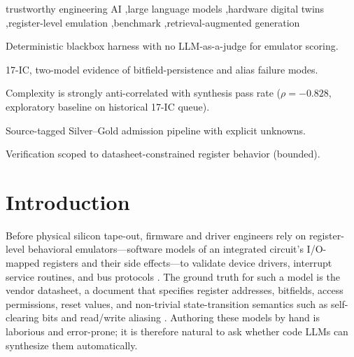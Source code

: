 \documentclass[preprint,review]{elsarticle}
\theoremstyle{definition}
\begin{document}
\begin{abstract}
\textbf{Conclusion.} The evidence indicates that bitfield persistence and address
aliasing constitute persistent, cross-model failure modes for code LLMs. We argue that
source constraints, explicit unknowns, conditional execution, and independent acceptance
jointly form an auditable agentic loop, and outline the verification and experiment
design required before submission.
\end{abstract}

\begin{keyword}
trustworthy engineering AI \sep large language models \sep hardware digital twins
\sep register-level emulation \sep benchmark \sep retrieval-augmented generation
\end{keyword}

\begin{highlights}
\item Deterministic blackbox harness with no LLM-as-a-judge for emulator scoring.
\item 17-IC, two-model evidence of bitfield-persistence and alias failure modes.
\item Complexity is strongly anti-correlated with synthesis pass rate ($\rho=-0.828$, exploratory baseline on historical 17-IC queue).
\item Source-tagged Silver--Gold admission pipeline with explicit unknowns.
\item Verification scoped to datasheet-constrained register behavior (bounded).
\end{highlights}

\maketitle

\section{Introduction}
\label{sec:intro}

Before physical silicon tape-out, firmware and driver engineers rely on register-level
behavioral emulators---software models of an integrated circuit's I/O-mapped registers
and their side effects---to validate device drivers, interrupt service routines, and
bus protocols \cite{bellard2005qemu,ghenassia2005transaction}. The ground truth for such
a model is the vendor datasheet, a document that specifies register addresses, bitfields,
access permissions, reset values, and non-trivial state-transition semantics such as
self-clearing bits and read/write aliasing \cite{thakur2023verilogeval}. Authoring these
models by hand is laborious and error-prone; it is therefore natural to ask whether code
LLMs can synthesize them automatically.
\end{document}
